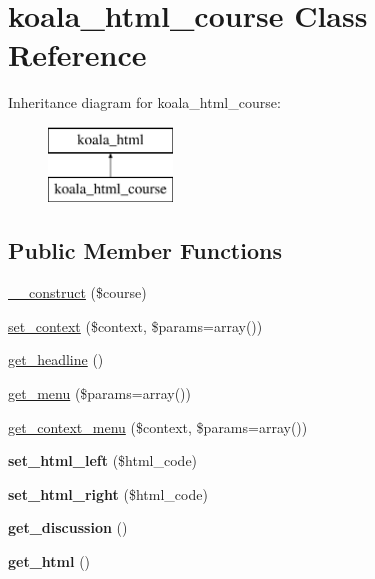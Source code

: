 \hypertarget{classkoala__html__course}{
\section{koala\_\-html\_\-course Class Reference}
\label{classkoala__html__course}
}
Inheritance diagram for koala\_\-html\_\-course:\begin{figure}[H]
\begin{center}
\leavevmode
\includegraphics[height=2.000000cm]{classkoala__html__course}
\end{center}
\end{figure}
\subsection*{Public Member Functions}
\begin{DoxyCompactItemize}
\item 
\hyperlink{classkoala__html__course_a67a9be86020b7792ce6d2dd9512c484b}{\_\-\_\-construct} (\$course)
\item 
\hyperlink{classkoala__html__course_a97b2c9164cce5d93b831e049c7ba6512}{set\_\-context} (\$context, \$params=array())
\item 
\hyperlink{classkoala__html__course_abf7940fe67e0cc17d0ebd15a9590a125}{get\_\-headline} ()
\item 
\hyperlink{classkoala__html__course_ae1fd17055b99b86514cadbcb5cbc0e69}{get\_\-menu} (\$params=array())
\item 
\hyperlink{classkoala__html__course_ab3332a7fc6ae83313b8c31e1774278e6}{get\_\-context\_\-menu} (\$context, \$params=array())
\item 
\hypertarget{classkoala__html__course_aab681f371f4b0d7108e1a44d7006356e}{
{\bfseries set\_\-html\_\-left} (\$html\_\-code)}
\label{classkoala__html__course_aab681f371f4b0d7108e1a44d7006356e}

\item 
\hypertarget{classkoala__html__course_aa0e84427b6f105c246bf1cc91bab0cbc}{
{\bfseries set\_\-html\_\-right} (\$html\_\-code)}
\label{classkoala__html__course_aa0e84427b6f105c246bf1cc91bab0cbc}

\item 
\hypertarget{classkoala__html__course_ad7f10738b912f6a338b9815df3754974}{
{\bfseries get\_\-discussion} ()}
\label{classkoala__html__course_ad7f10738b912f6a338b9815df3754974}

\item 
\hypertarget{classkoala__html__course_a49aabb6e9ca9e284fe88beaa6f1be559}{
{\bfseries get\_\-html} ()}
\label{classkoala__html__course_a49aabb6e9ca9e284fe88beaa6f1be559}

\end{DoxyCompactItemize}


